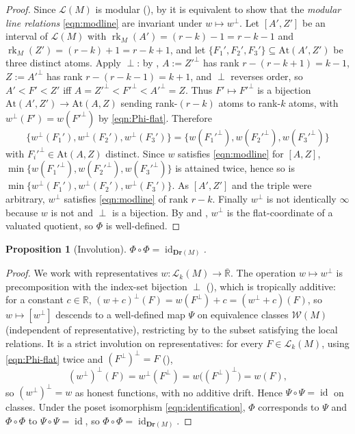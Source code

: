 \documentclass{article}
\newtheorem{proposition}[theorem]{Proposition}
\theoremstyle{definition}
\newcommand{\Rbar}{\overline{\mathbb{R}}}
\newcommand{\R}{\mathbb{R}}
\newcommand{\rk}{\operatorname{rk}}
\newcommand{\Dr}{\mathbf{Dr}}
\newcommand{\cLL}{\mathcal{L}}
\newcommand{\cW}{\mathcal{W}}
\begin{document}
\begin{proof}
Since $\cLL(M)$ is modular (), by  it is equivalent to show that
the \emph{modular line relations} \eqref{eqn:modline} are invariant under $w\mapsto w^{\perp}$. Let
$[A',Z']$ be an interval of $\cLL(M)$ with $\rk_M(A')=(r-k)-1=r-k-1$ and $\rk_M(Z')=(r-k)+1=r-k+1$,
and let $\{F_1',F_2',F_3'\}\subseteq\mathrm{At}(A',Z')$ be three distinct atoms. Apply $\perp$: by
, $A:=Z'^{\perp}$ has rank $r-(r-k+1)=k-1$, $Z:=A'^{\perp}$ has rank
$r-(r-k-1)=k+1$, and $\perp$ reverses order, so $A'<F'<Z'$ iff $A=Z'^{\perp}<F'^{\perp}<A'^{\perp}=Z$.
Thus $F'\mapsto F'^{\perp}$ is a bijection $\mathrm{At}(A',Z')\to\mathrm{At}(A,Z)$ sending rank-$(r-k)$
atoms to rank-$k$ atoms, with $w^{\perp}(F')=w(F'^{\perp})$ by \eqref{eqn:Phi-flat}. Therefore
\[
  \{w^{\perp}(F_1'),w^{\perp}(F_2'),w^{\perp}(F_3')\}=\{w(F_1'^{\perp}),w(F_2'^{\perp}),
  w(F_3'^{\perp})\}
\]
with $F_i'^{\perp}\in\mathrm{At}(A,Z)$ distinct. Since $w$ satisfies \eqref{eqn:modline} for $[A,Z]$,
$\min\{w(F_1'^{\perp}),w(F_2'^{\perp}),w(F_3'^{\perp})\}$ is attained twice, hence so is
$\min\{w^{\perp}(F_1'),w^{\perp}(F_2'),w^{\perp}(F_3')\}$. As $[A',Z']$ and the triple were arbitrary,
$w^{\perp}$ satisfies \eqref{eqn:modline} of rank $r-k$. Finally $w^{\perp}$ is not identically
$\infty$ because $w$ is not and $\perp$ is a bijection. By  and ,
$w^{\perp}$ is the flat-coordinate of a valuated quotient, so $\Phi$ is well-defined.
\end{proof}

\begin{proposition}[Involution]\label{prop:inv}
$\Phi\circ\Phi=\operatorname{id}_{\Dr(M)}$.
\end{proposition}

\begin{proof}
We work with representatives $w\colon\cLL_k(M)\to\Rbar$. The operation $w\mapsto w^{\perp}$ is
precomposition with the index-set bijection $\perp$ (), which is tropically additive:
for a constant $c\in\R$, $(w+c)^{\perp}(F)=w(F^{\perp})+c=(w^{\perp}+c)(F)$, so $w\mapsto[w^{\perp}]$
descends to a well-defined map $\Psi$ on equivalence classes $\cW(M)$ (independent of representative),
restricting by  to the subset satisfying the local relations. It is a strict involution
on representatives: for every $F\in\cLL_k(M)$, using \eqref{eqn:Phi-flat} twice and $(F^{\perp})^{\perp}
=F$ (),
\[
  (w^{\perp})^{\perp}(F)=w^{\perp}(F^{\perp})=w\bigl((F^{\perp})^{\perp}\bigr)=w(F),
\]
so $(w^{\perp})^{\perp}=w$ as honest functions, with no additive drift. Hence $\Psi\circ\Psi=
\operatorname{id}$ on classes. Under the poset isomorphism \eqref{eqn:identification}, $\Phi$
corresponds to $\Psi$ and $\Phi\circ\Phi$ to $\Psi\circ\Psi=\operatorname{id}$, so
$\Phi\circ\Phi=\operatorname{id}_{\Dr(M)}$.
\end{proof}
\end{document}

